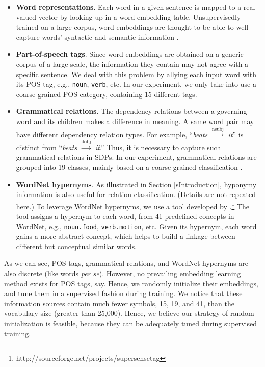 \documentclass[11pt,a4paper]{article}
\begin{document}
\begin{itemize}
\item \textbf{Word representations}. Each word in a given sentence is mapped to a real-valued vector by looking up 
in a word embedding table. Unsupervisedly trained on a large corpus, word embeddings are thought to be able to well capture words' syntactic and semantic information \cite{2013Mikolov}.
\item \textbf{Part-of-speech tags}. Since word embeddings are obtained on
a generic corpus of a large scale, the information they contain may not agree with a specific sentence. We deal with this problem by allying each input word with its POS tag,
 e.g., \verb|noun|, \verb|verb|, etc. In our experiment, we only take into use a coarse-grained POS category, containing 15 different tags.

\item \textbf{Grammatical relations}.
The dependency relations between a governing word and its children
makes a difference in meaning. 
A same word pair may have different dependency relation types.
For example,
``\textit{beats} $\xrightarrow{\operatorname{nsubj}}$ \textit{it}''
 is distinct from
``\textit{beats} $\xrightarrow{\operatorname{dobj}}$ \textit{it}.''
Thus, it is necessary to capture such grammatical relations in SDPs.
In our experiment, grammatical relations are grouped into 19 classes, mainly based on a coarse-grained 
classification \cite{TypeDep}.
\item \textbf{WordNet hypernyms}. As illustrated in Section \ref{sIntroduction},
hyponymy information is also useful for relation classification.
(Details are not repeated here.)
To leverage WordNet hypernyms,
we use a tool developed by
.\footnote{http://sourceforge.net/projects/supersensetag}
The tool assigns a hypernym to each word, from 41 predefined concepts in WordNet,
e.g., \verb|noun.food|, \verb|verb.motion|, etc.
Given its hypernym, each word gains a more abstract concept, which helps to build a linkage between different but conceptual similar words.
\end{itemize}

As we can see, POS tags, grammatical relations, and WordNet hypernyms
are also discrete (like words \textit{per se}).
However, no prevailing embedding learning method exists
for POS tags, say.
Hence, we randomly initialize their embeddings, and tune them in a supervised fashion
during training. We notice that these information sources contain much fewer
symbols, 15, 19, and 41, than the vocabulary size (greater than 25,000). Hence, we believe
our strategy of random initialization is feasible, because they can be
adequately tuned during supervised training.
\end{document}
